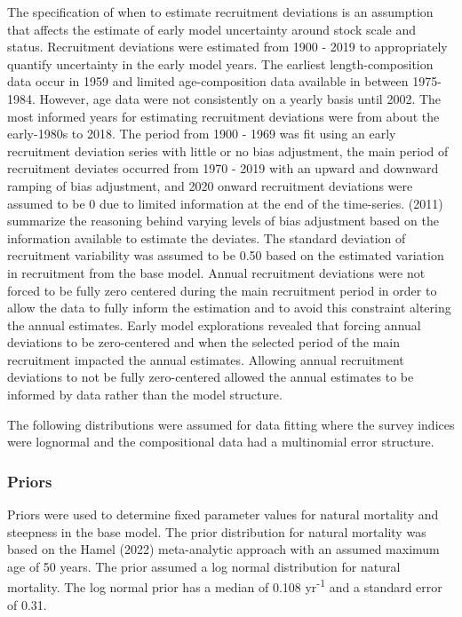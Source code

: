 \documentclass[11pt,
  english,
  letterpaper,
]{article}
\begin{document}
The specification of when to estimate recruitment deviations is an assumption that affects the estimate of early model uncertainty around stock scale and status. Recruitment deviations were estimated from 1900 - 2019 to appropriately quantify uncertainty in the early model years. The earliest length-composition data occur in 1959 and limited age-composition data available in between 1975-1984. However, age data were not consistently on a yearly basis until 2002. The most informed years for estimating recruitment deviations were from about the early-1980s to 2018. The period from 1900 - 1969 was fit using an early recruitment deviation series with little or no bias adjustment, the main period of recruitment deviates occurred from 1970 - 2019 with an upward and downward ramping of bias adjustment, and 2020 onward recruitment deviations were assumed to be 0 due to limited information at the end of the time-series. (2011) summarize the reasoning behind varying levels of bias adjustment based on the information available to estimate the deviates. The standard deviation of recruitment variability was assumed to be 0.50 based on the estimated variation in recruitment from the base model. Annual recruitment deviations were not forced to be fully zero centered during the main recruitment period in order to allow the data to fully inform the estimation and to avoid this constraint altering the annual estimates. Early model explorations revealed that forcing annual deviations to be zero-centered and when the selected period of the main recruitment impacted the annual estimates. Allowing annual recruitment deviations to not be fully zero-centered allowed the annual estimates to be informed by data rather than the model structure.

The following distributions were assumed for data fitting where the survey indices were lognormal and the compositional data had a multinomial error structure.

\hypertarget{priors}{%
\subsubsection{Priors}\label{priors}}

Priors were used to determine fixed parameter values for natural mortality and steepness in the base model. The prior distribution for natural mortality was based on the Hamel (2022) meta-analytic approach with an assumed maximum age of 50 years. The prior assumed a log normal distribution for natural mortality. The log normal prior has a median of 0.108 yr\textsuperscript{-1} and a standard error of 0.31.
\end{document}
